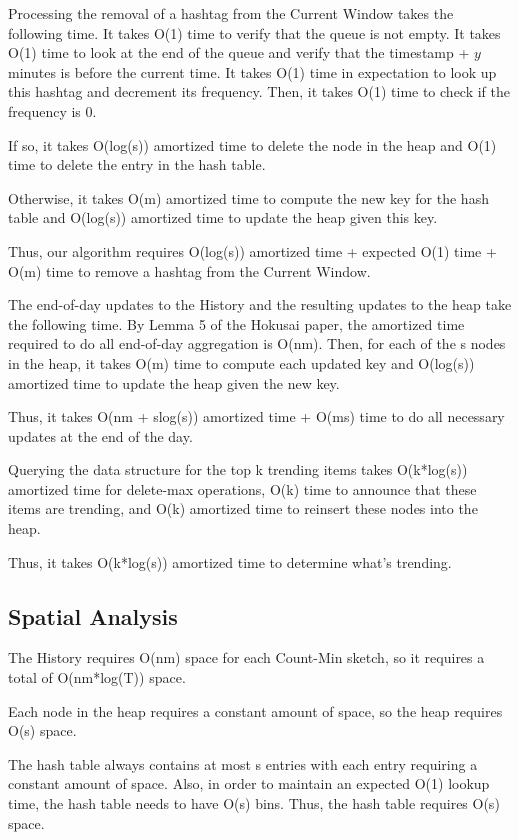 \documentclass[twoside]{article}
\begin{document}
Processing the removal of a hashtag from the Current Window takes the following time.  It takes O(1) time to verify that the queue is not empty.  It takes O(1) time to look at the end of the queue and verify that the timestamp + $y$ minutes is before the current time.  It takes O(1) time in expectation to look up this hashtag and decrement its frequency.  Then, it takes O(1) time to check if the frequency is 0.

If so, it takes O(log(s)) amortized time to delete the node in the heap and O(1) time to delete the entry in the hash table.

Otherwise, it takes O(m) amortized time to compute the new key for the hash table and O(log(s)) amortized time to update the heap given this key.

Thus, our algorithm requires O(log(s)) amortized time + expected O(1) time  + O(m) time to remove a hashtag from the Current Window.

The end-of-day updates to the History and the resulting updates to the heap take the following time.  By Lemma 5 of the Hokusai paper, the amortized time required to do all end-of-day aggregation is O(nm).  Then, for each of the s nodes in the heap, it takes O(m) time to compute each updated key and O(log(s)) amortized time to update the heap given the new key.

Thus, it takes O(nm + slog(s)) amortized time + O(ms) time to do all necessary updates at the end of the day.

Querying the data structure for the top k trending items takes O(k*log(s)) amortized time for delete-max operations, O(k) time to announce that these items are trending, and O(k) amortized time to reinsert these nodes into the heap.

Thus, it takes O(k*log(s)) amortized time to determine what’s trending.


\subsection{Spatial Analysis}

The History requires O(nm) space for each Count-Min sketch, so it requires a total of O(nm*log(T)) space.

Each node in the heap requires a constant amount of space, so the heap requires O(s) space.

The hash table always contains at most s entries with each entry requiring a constant amount of space.  Also, in order to maintain an expected O(1) lookup time, the hash table needs to have O(s) bins.  Thus, the hash table requires O(s) space.
\end{document}

